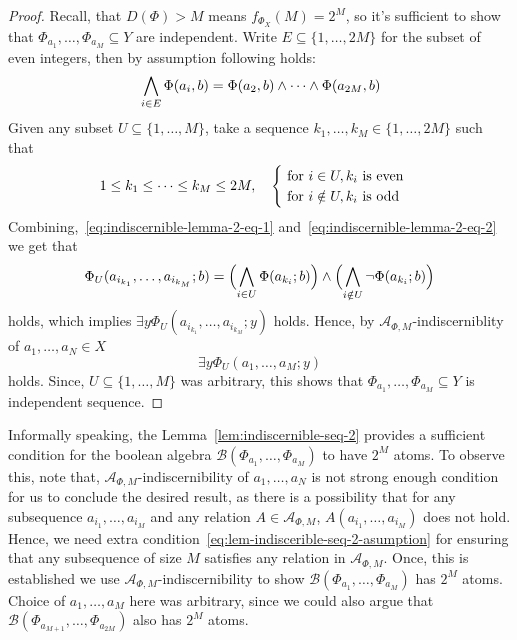 \begin{proof}

    Recall, that $D(\Phi) > M$ means $f_{\Phi_X}(M) = 2^M$, so it's sufficient to show that $\Phi_{a_1}, \dots, \Phi_{a_M} \subseteq Y$ are independent. Write $E \subseteq \{1, \dots, 2M\}$ for the subset of even integers, then by assumption following holds:
    \begin{equation}{\label{eq:indiscernible-lemma-2-eq-1}}
        \bigwedge_{i \in E}\Phi(a_i, b) = \Phi(a_2, b) \land \dots \land \Phi(a_{2M}, b)
    \end{equation}
    Given any subset $U \subseteq \{1, \dots, M\}$, take a sequence $k_1, \dots, k_M \in \{1, \dots, 2M\}$ such that
    \begin{equation}{\label{eq:indiscernible-lemma-2-eq-2}}
        1 \leq k_1 \leq \dots \leq k_M \leq 2M, \quad \begin{cases}
                                                          \text{ for } i \in U, k_i \text{ is even} \\
                                                          \text{ for } i \notin U, k_i \text{ is odd}
        \end{cases}
    \end{equation}
    Combining,~\ref{eq:indiscernible-lemma-2-eq-1} and~\ref{eq:indiscernible-lemma-2-eq-2} we get that
    \[
        \Phi_{U}(a_{i_{k_1}}, \dots,a_{i_{k_M}}; b) = \Bigl(\bigwedge_{i \in U} \Phi(a_{k_i}; b) \Bigr) \land \Bigl(\bigwedge_{i \notin U} \neg \Phi(a_{k_i}; b)\Bigr)
    \]
    holds, which implies $\exists y \Phi_{U}(a_{i_{k_1}}, \dots,a_{i_{k_M}}; y)$ holds. Hence, by $\mathcal{A}_{\Phi, M}$-indiscerniblity of  $a_1, \dots, a_N \in X$
    \[
        \exists y \Phi_{U}(a_{1}, \dots,a_{M}; y)
    \]
    holds. Since, $U \subseteq \{1, \dots, M\}$ was arbitrary, this shows that $\Phi_{a_1}, \dots, \Phi_{a_M} \subseteq Y$ is independent sequence.
\end{proof}

\begin{remark}
    Informally speaking, the Lemma~\ref{lem:indiscernible-seq-2} provides a sufficient condition for the boolean algebra $\mathcal{B}(\Phi_{a_1}, \dots, \Phi_{a_M})$ to have $2^M$ atoms. To observe this, note that, $\mathcal{A}_{\Phi, M}$-indiscernibility of $a_1, \dots, a_N$ is not strong enough condition for us to conclude the desired result, as there is a possibility that for any subsequence $a_{i_1}, \dots, a_{i_M}$ and any relation $A \in \mathcal{A}_{\Phi, M}$, $A(a_{i_1}, \dots, a_{i_M})$ does not hold. Hence, we need extra condition~\ref{eq:lem-indiscerible-seq-2-asumption} for ensuring that any subsequence of size $M$ satisfies any relation in $\mathcal{A}_{\Phi, M}$. Once, this is established we use $\mathcal{A}_{\Phi, M}$-indiscernibility to show $\mathcal{B}(\Phi_{a_1}, \dots, \Phi_{a_M})$ has $2^M$ atoms. Choice of $a_1, \dots, a_M$ here was arbitrary, since we could also argue that  $\mathcal{B}(\Phi_{a_{M+1}}, \dots, \Phi_{a_{2M}})$ also has $2^M$ atoms.
\end{remark}

